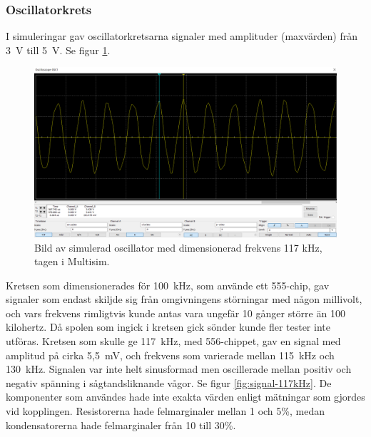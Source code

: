 \documentclass[a4paper]{article}
\makeatletter
\let\\\@raggedtwoe@savedcr%
\makeatother
\begin{document}
\begin{sloppypar}
    \subsubsection{Oscillatorkrets}
    I simuleringar gav oscillatorkretsarna signaler med amplituder (maxvärden) från 3~V till 5~V. Se figur \ref{fig:sim-117kHz}.

    \begin{figure}[H]
        \centering
        \includegraphics[width=\textwidth]{multisim-signal-555-117kHz.png}
        \caption{Bild av simulerad oscillator med dimensionerad frekvens 117 kHz, tagen i Multisim.}
        \label{fig:sim-117kHz}
    \end{figure}
    \noindent
    Kretsen som dimensionerades för 100~kHz, som använde ett 555-chip, gav signaler som endast skiljde sig från omgivningens störningar med någon millivolt, och vars frekvens rimligtvis kunde antas vara ungefär 10 gånger större än 100 kilohertz.
    Då spolen som ingick i kretsen gick sönder kunde fler tester inte utföras.
    \\\\
    Kretsen som skulle ge 117~kHz, med 556-chippet, gav en signal med amplitud på cirka 5,5~mV, och frekvens som varierade mellan 115~kHz och 130~kHz.
    Signalen var inte helt sinusformad men oscillerade mellan positiv och negativ spänning i sågtandsliknande vågor. Se figur \ref{fig:signal-117kHz}.
    \\\\
    De komponenter som användes hade inte exakta värden enligt mätningar som gjordes vid kopplingen. Resistorerna hade felmarginaler mellan 1 och 5\%, medan kondensatorerna hade felmarginaler från 10 till 30\%.


\end{sloppypar}
\end{document}
